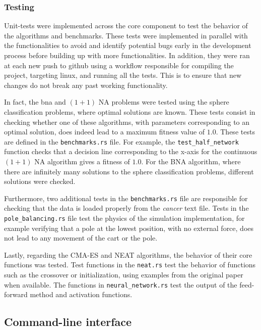 \subsubsection{Testing}

Unit-tests were implemented across the core component to test the behavior of the algorithms and benchmarks.
These tests were implemented in parallel with the functionalities to avoid and identify potential bugs early in the development process before
building up with more functionalities. In addition, they were ran at each new push to github using a workflow responsible for compiling the project,
targeting linux, and running all the tests. This is to ensure that new changes do not break any past working functionality.

In fact, the bna and $(1 + 1)$ NA problems were tested using the sphere classification problems, where optimal solutions are known. These tests
consist in checking whether one of these algorithms, with parameters corresponding to an optimal solution, does indeed lead to a maximum fitness value
of $1.0$. These tests are defined in the \texttt{benchmarks.rs} file. For example, the \texttt{test\_half\_network} function checks that a decision line
corresponding to the x-axis for the continuous $(1 + 1)$ NA algorithm gives a fitness of $1.0$. For the BNA algorithm, where there are infinitely many
solutions to the sphere classification problems, different solutions were checked.

Furthermore, two additional tests in the \texttt{benchmarks.rs} file are responsible for checking that the data is loaded properly from the \textit{cancer}
text file. Tests in the \texttt{pole\_balancing.rs} file test the physics of the simulation implementation, for example verifying that a pole at the lowest
position, with no external force, does not lead to any movement of the cart or the pole.

Lastly, regarding the CMA-ES and NEAT algorithms, the behavior of their core functions was tested. Test functions in the \texttt{neat.rs} test the
behavior of functions such as the crossover or initialization, using examples from the original paper \cite{neat} when available. The functions in
\texttt{neural\_network.rs} test the output of the feed-forward method and activation functions.

\subsection{Command-line interface}

